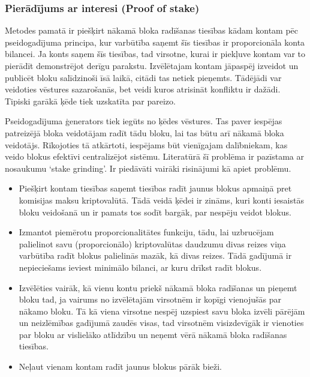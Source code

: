 \subsubsection{Pierādījums ar interesi (Proof of stake)}
Metodes pamatā ir piešķirt nākamā bloka radīšanas tiesības kādam kontam pēc pseidogadījuma principa, kur varbūtība saņemt šīs tiesības ir proporcionāla konta bilancei. Ja konts saņem šīs tiesības, tad virsotne, kurai ir piekļuve kontam var to pierādīt demonstrējot derīgu parakstu. Izvēlētajam kontam jāpaspēj izveidot un publicēt bloku salīdzinoši īsā laikā, citādi tas netiek pieņemts. Tādējādi var veidoties vēstures sazarošanās, bet veidi kuros atrisināt konfliktu ir dažādi. Tipiski garākā ķēde tiek uzskatīta par pareizo.

Pseidogadījuma ģenerators tiek iegūts no ķēdes vēstures. Tas paver iespējas patreizējā bloka veidotājam radīt tādu bloku, lai tas būtu arī nākamā bloka veidotājs. Rīkojoties tā atkārtoti, iespējams būt vienīgajam dalībniekam, kas veido blokus efektīvi centralizējot sistēmu. Literatūrā šī problēma ir pazīstama ar nosaukumu `stake grinding'. Ir piedāvāti vairāki risinājumi kā apiet problēmu.\cite{popov16,dannen17}
\begin{itemize}
    \item Piešķirt kontam tiesības saņemt tiesības radīt jaunus blokus apmaiņā pret komisijas maksu kriptovalūtā. Tādā veidā ķēdei ir zināms, kuri konti iesaistās bloku veidošanā un ir pamats tos sodīt bargāk, par nespēju veidot blokus.
    \item Izmantot piemērotu proporcionalitātes funkciju, tādu, lai uzbrucējam palielinot savu (proporcionālo) kriptovalūtas daudzumu divas reizes viņa varbūtība radīt blokus palielinās mazāk, kā divas reizes.\cite{popov16} Tādā gadījumā ir nepieciešams ieviest minimālo bilanci, ar kuru drīkst radīt blokus.
    \item Izvēlēties vairāk, kā vienu kontu priekš nākamā bloka radīšanas un pieņemt bloku tad, ja vairums no izvēlētajām virsotnēm ir kopīgi vienojušās par nākamo bloku. Tā kā viena virsotne nespēj uzspiest savu bloka izvēli pārējām un neizlēmības gadījumā zaudēs visas, tad virsotnēm visizdevīgāk ir vienoties par bloku ar vislielāko atlīdzību un neņemt vērā nākamā bloka radīšanas tiesības.
    \item Neļaut vienam kontam radīt jaunus blokus pārāk bieži.
\end{itemize}

